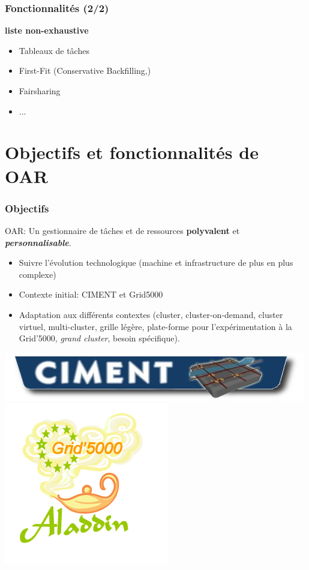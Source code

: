 \documentclass{beamer}
\begin{document}
\begin{frame}
\frametitle{Fonctionnalités (2/2)}
	{\bf liste non-exhaustive}
		\begin{itemize}
    \item Tableaux de tâches
		\item First-Fit (Conservative Backfilling,)
		\item Fairsharing
    \item ... 
		
	\end{itemize}
\end{frame}


\section{Objectifs et fonctionnalités de OAR}


\begin{frame}
	\frametitle{Objectifs} \hypertarget{objectifs}{}

	OAR: Un gestionnaire de tâches et de ressources {\bf polyvalent} et {\bf {\em personnalisable}}.

	\begin{itemize}
		\item Suivre l'évolution technologique (machine et infrastructure de plus en plus complexe)
		\item Contexte initial: CIMENT \hyperlink{ciment-appendix}{ }  et Grid5000 \hyperlink{g5k-appendix}{ }
                \item Adaptation aux différents contextes (cluster, cluster-on-demand, cluster virtuel, multi-cluster, grille légère, plate-forme pour l'expérimentation à la Grid'5000, {\em grand cluster}, besoin spécifique). 
	\end{itemize}

\begin{center}
        \hspace{1ex}
        \includegraphics[height=2ex]{img/ciment-logo2.jpg}
        \hspace{1ex}
        \includegraphics[height=7ex]{img/Logo_Aladdin.png}
\end{center}


\end{frame}
\end{document}
